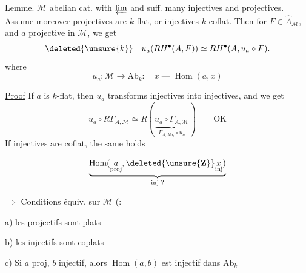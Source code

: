 \uline{Lemme.} $\mathcal M$ abelian  cat. with  $\varprojlim$ and suff.
many injectives and projectives. Assume moreover projectives are $k$-flat, \uline{or} injectives $k$-coflat. Then
for $F\in\widehat A_{\mathcal M}$,  and $a$ projective in $\mathcal M$, we get
\[
\deleted{\unsure{k}}\quad u_a(RH^\bullet(A,F))\simeq RH^\bullet(A,u_a\circ F).
\]
where
\[
u_a:\mathcal M\longrightarrow\mathrm{Ab}_k:\quad x\mathbin{\text{---}}\operatorname{Hom}(a,x)
\]

\uline{Proof} If $a$ is $k$-flat, then $u_a$ transforms injectives into injectives, and we get
\[
u_a\circ R\Gamma_{A,\mathcal M}\simeq
R(\underbrace{u_a\circ\Gamma_{A,\mathcal M}}_{\Gamma_{A,\mathrm{Ab}_k}\circ u_a})
\qquad\mathrm{OK}
\]
If injectives are coflat, the same holds

\[
\underbrace{\operatorname{Hom}(\underset{\mathrm{proj}}a,\deleted{\unsure{\mathbf Z}}\underset{\mathrm{inj}}x)}_{\text{inj ?}}
\]

$\Rightarrow$ Conditions équiv. sur $\mathcal M$ (:

a) les projectifs sont plats

b) les injectifs sont coplats

c) Si $a$ proj, $b$ injectif, alors $\operatorname{Hom}(a,b)$ est injectif dans $\mathrm{Ab}_k$
